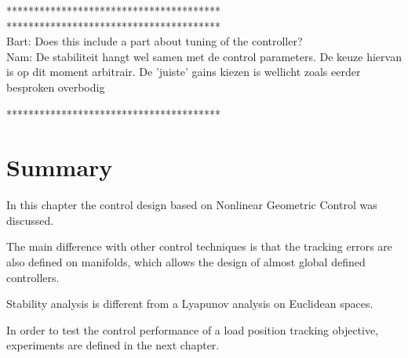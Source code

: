***************************************\\


***************************************\\
Bart: Does this include a part about tuning of the controller?\\
Nam: De stabiliteit hangt wel samen met de control parameters. De keuze hiervan is op dit moment arbitrair. De 'juiste' gains kiezen is wellicht zoals eerder besproken overbodig 

***************************************\\

\section*{Summary}

In this chapter the control design based on Nonlinear Geometric Control was discussed.

The main difference with other control techniques is that the tracking errors are also defined on manifolds, which allows the design of almost global defined controllers.

Stability analysis is different from a Lyapunov analysis on Euclidean spaces.


In order to test the control performance of a load position tracking objective, experiments are defined in the next chapter. 




